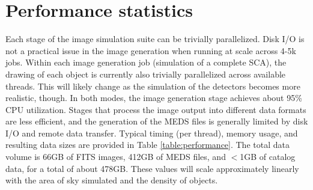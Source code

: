\documentclass[usenatbib]{mnras}
\begin{document}
\section{Performance statistics}
\label{app:performance}

Each stage of the image simulation suite can be trivially parallelized. Disk I/O is not a practical issue in the image generation when running at scale across 4-5k jobs. Within each image generation job (simulation of a complete SCA), the drawing of each object is currently also trivially parallelized across available threads. This will likely change as the simulation of the detectors becomes more realistic, though. In both modes, the image generation stage achieves about 95\% CPU utilization. Stages that process the image output into different data formats are less efficient, and the generation of the MEDS files is generally limited by disk I/O and remote data transfer. Typical timing (per thread), memory usage, and resulting data sizes are provided in Table \ref{table:performance}. The total data volume is 66GB of FITS images, 412GB of MEDS files, and $<$1GB of catalog data, for a total of about 478GB. These values will scale approximately linearly with the area of sky simulated and the density of objects.

\begin{table}
\end{table}
\end{document}
